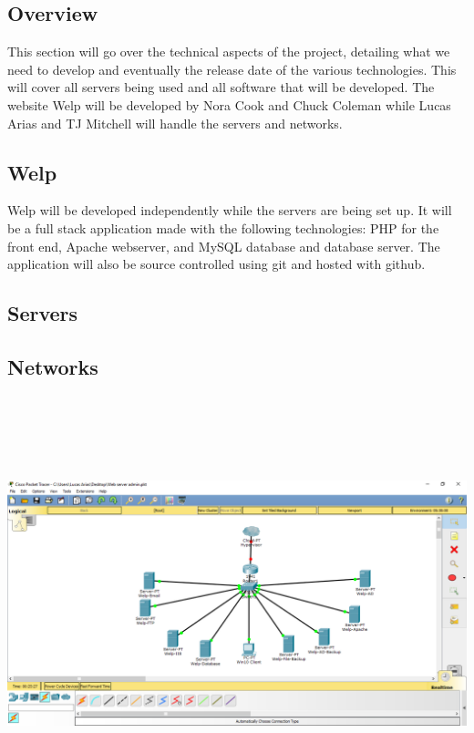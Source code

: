 \documentclass[12pt]{article}
\begin{document}
        \subsection{Overview}
                This section will go over the technical aspects of the 
                project,  detailing what we need to develop and eventually the 
                release date of the various technologies. This will cover all 
                servers being used and all software that will be developed. The 
                website Welp will be developed by Nora Cook and Chuck Coleman while
                Lucas Arias and TJ Mitchell will handle the servers and networks. 

        \subsection{Welp}
                Welp will be developed independently while the servers are
                being set up. It will be a full stack application made with the 
                following technologies: PHP for the front end, Apache webserver, 
                and MySQL database and database server. The application will also
                be source controlled using git and hosted with github. 

        \subsection{Servers}

        \subsection{Networks}
                \includegraphics[width=15cm, height=12cm]{topology.png}
\end{document}
